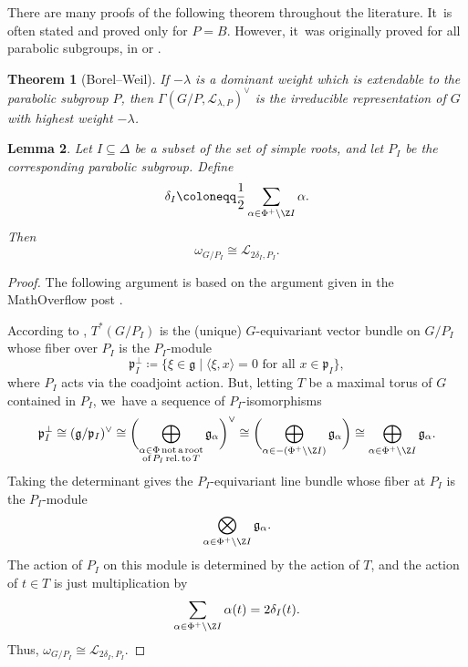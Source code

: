 \documentclass[JEP,XML,SOM,Unicode,published]{cedram}
\newtheorem{thm}{Theorem}[section]
\newtheorem{lem}[thm]{Lemma}
\begin{document}
There are many proofs of the following theorem throughout the literature. It~is often stated and proved only for $P=B$. However, it~was originally proved for all parabolic subgroups, \eg in \cite{Ser54} or \cite[Cor.\,to Th.\,V]{Bot57}.

\begin{thm}[Borel--Weil]\label{th:borel-weil}
If $-\lambda$ is a dominant weight which is extendable to the parabolic subgroup $P$, then $\Gamma(G/P,\mathscr{L}_{\lambda, P})^\vee$ is the irreducible representation of $G$ with highest weight $-\lambda$.
\end{thm}

\begin{lem}\label{can-as-char}
Let $I\subseteq \Delta$ be a subset of the set of simple roots, and let $P_I$ be the corresponding parabolic subgroup. Define
\begin{equation*}
\delta_I \coloneqq \frac{1}{2}\sum_{\alpha\in \Phi^+\setminus \Z I} \alpha.
\end{equation*}
Then
\begin{equation*}
\omega_{G/P_I} \cong \mathscr{L}_{2\delta_I, P_I}.
\end{equation*}
\end{lem}

\begin{proof}
The following argument is based on the argument given in the MathOverflow post \cite{403574}.

According to \cite[Lem.\,1.4.9]{CG10}, $T^*(G/P_I)$ is the (unique) $G$-equivariant vector bundle on $G/P_I$ whose fiber over $P_I$ is the $P_I$\nobreakdash-mod\-ule
\[
\mathfrak{p}_I^\perp\coloneqq \{\xi \in \mathfrak{g} \mid \langle \xi, x\rangle = 0 \text{ for all }x\in \mathfrak{p}_I\},
\]
where $P_I$ acts via the coadjoint action.
But, letting $T$ be a maximal torus of $G$ contained in $P_I$, we~have a sequence of $P_I$-isomorphisms
\begin{align*}
\mathfrak{p}_I^\perp \cong (\mathfrak{g}/\mathfrak{p}_I)^\vee
\cong \biggl(\bigoplus_{\substack{\alpha\in \Phi\text{\,not\,a\,root}\\\text{of\,}P_I\text{\,rel.\,to\,}T}}\mathfrak{g}_\alpha\biggr)^\vee
\cong \biggl(\bigoplus_{\alpha\in -(\Phi^+\setminus \Z I)} \mathfrak{g}_\alpha\biggr)
\cong \bigoplus_{\alpha\in \Phi^+\setminus \Z I} \mathfrak{g}_\alpha.
\end{align*}
Taking the determinant gives the $P_I$-equivariant line bundle whose fiber at $P_I$ is the $P_I$\nobreakdash-mod\-ule
\begin{equation*}
\bigotimes_{\alpha\in \Phi^+\setminus \Z I} \mathfrak{g}_\alpha.
\end{equation*}
The action of $P_I$ on this module is determined by the action of $T$, and the action of $t\in T$ is just multiplication by
\[
\sum_{\alpha \in \Phi^+\setminus \Z I} \alpha(t) = 2\delta_I(t).
\]
Thus, $\omega_{G/P_I} \cong \mathscr{L}_{2\delta_I, P_I}$.
\end{proof}
\end{document}
